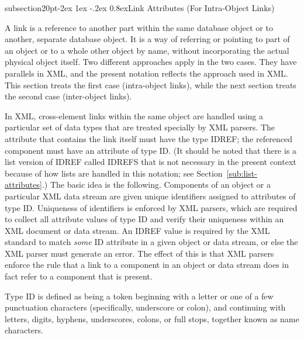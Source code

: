 \documentclass[10pt]{article}
\makeatletter
\renewcommand{\subsection}{\@startsection%
  {subsection}{2}{0pt}{-2ex \@plus 1ex \@minus -.2ex}%
  {0.8ex}{\slshape\large\bfseries}}
\newcommand{\class}[1]{\textsf{#1}}
\makeatother
\begin{document}
\subsection{Link Attributes (For Intra-Object Links)}

A link is a reference to another part within the same database object or to
another, separate database object.  It is a way of referring or pointing to
part of an object or to a whole other object by name, without incorporating
the actual physical object itself.  Two different approaches apply in the
two cases.  They have parallels in XML, and the present notation reflects
the approach used in XML.  This section treats the first case (intra-object
links), while the next section treats the second case (inter-object links).

In XML, cross-element links within the same object are handled using a
particular set of data types that are treated specially by XML parsers.
The attribute that contains the link itself must have the type
\class{IDREF}; the referenced component must have an attribute of type
\class{ID}.  (It should be noted that there is a list version of
\class{IDREF} called \class{IDREFS} that is not necessary in the present
context because of how lists are handled in this notation; see
Section~\ref{sub:list-attributes}.)  The basic idea is the following.
Components of an object or a particular XML data stream are given unique
identifiers assigned to attributes of type \class{ID}.  Uniqueness of
identifiers is enforced by XML parsers, which are required to collect all
attribute values of type \class{ID} and verify their uniqueness within an
XML document or data stream.  An \class{IDREF} value is required by the XML
standard to match \emph{some} \class{ID} attribute in a given object or
data stream, or else the XML parser must generate an error.  The effect of
this is that XML parsers enforce the rule that a link to a component in an
object or data stream does in fact refer to a component that is present.

Type \class{ID} is defined as being a token beginning with a letter or one
of a few punctuation characters (specifically, underscore or colon), and
continuing with letters, digits, hyphens, underscores, colons, or full
stops, together known as name characters.
\end{document}
